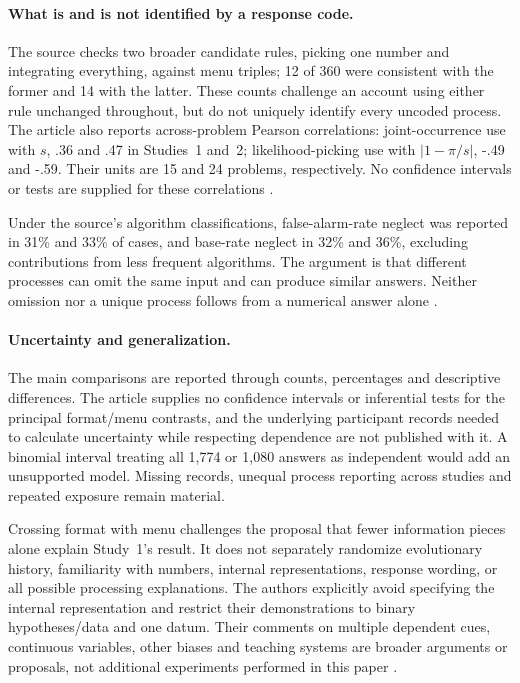 \paragraph{What is and is not identified by a response code.}
The source checks two broader candidate rules, picking one number and
integrating everything, against menu triples; 12 of 360 were consistent
with the former and 14 with the latter. These counts challenge an account
using either rule unchanged throughout, but do not uniquely identify every
uncoded process. The article also reports across-problem Pearson correlations:
joint-occurrence use with \(s\), .36 and .47 in Studies~1 and~2;
likelihood-picking use with \(\lvert1-\pi/s\rvert\), -.49 and -.59.
Their units are 15 and 24 problems, respectively. No confidence intervals
or tests are supplied for these correlations
\cite[pp.~698--699]{GigerenzerHoffrage1995FrequencyFormats}.

Under the source's algorithm classifications, false-alarm-rate neglect was
reported in 31\% and 33\% of cases, and base-rate neglect in 32\% and
36\%, excluding contributions from less frequent algorithms. The argument
is that different processes can omit the same input and can produce similar
answers. Neither omission nor a unique process follows from a numerical
answer alone \cite[pp.~699--700]{GigerenzerHoffrage1995FrequencyFormats}.

\paragraph{Uncertainty and generalization.}
The main comparisons are reported through counts, percentages and descriptive
differences. The article supplies no confidence intervals or inferential
tests for the principal format/menu contrasts, and the underlying participant
records needed to calculate uncertainty while respecting dependence are not
published with it. A binomial interval treating all 1,774 or 1,080 answers
as independent would add an unsupported model. Missing records, unequal
process reporting across studies and repeated exposure remain material.

Crossing format with menu challenges the proposal that fewer information
pieces alone explain Study~1's result. It does not separately randomize
evolutionary history, familiarity with numbers, internal representations,
response wording, or all possible processing explanations. The authors
explicitly avoid specifying the internal representation and restrict their
demonstrations to binary hypotheses/data and one datum. Their comments on
multiple dependent cues, continuous variables, other biases and teaching
systems are broader arguments or proposals, not additional experiments
performed in this paper \cite[pp.~685, 698--701]{GigerenzerHoffrage1995FrequencyFormats}.

